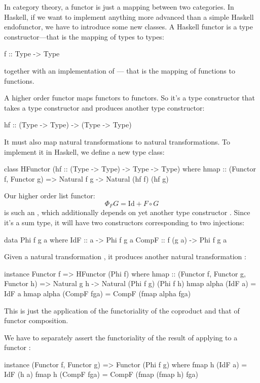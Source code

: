 \documentclass[DaoFP]{subfiles}
\begin{document}
In category theory, a functor is just a mapping between two categories. In Haskell, if we want to implement anything more advanced than a simple Haskell endofunctor, we have to introduce some new classes. A Haskell functor is a type constructor---that is the mapping of types to types:
\begin{haskell}
f :: Type -> Type
\end{haskell}
together with an implementation of --- that is the mapping of functions to functions. 

A higher order functor maps functors to functors. So it's a type constructor that takes a type constructor and produces another type constructor:
\begin{haskell}
hf :: (Type -> Type) -> (Type -> Type)
\end{haskell}
It must also map natural transformations to natural transformations. To implement it in Haskell, we define a new type class:
\begin{haskell}
class HFunctor (hf :: (Type -> Type) -> Type -> Type) where
   hmap :: (Functor f, Functor g) => 
       Natural f g -> Natural (hf f) (hf g)
\end{haskell}

Our higher order list functor:
\[ \Phi_F G = \text{Id} + F \circ G \]
is such an , which additionally depends on yet another type constructor . Since it's a sum type, it will have two constructors corresponding to two injections:
\begin{haskell}
data Phi f g a where
   IdF :: a -> Phi f g a
   CompF :: f (g a) -> Phi f g a
\end{haskell}
Given a natural transformation , it produces another natural transformation :
\begin{haskell}
instance Functor f => HFunctor (Phi f) where
   hmap :: (Functor f, Functor g, Functor h) =>
          Natural g h -> Natural (Phi f g) (Phi f h)
   hmap alpha (IdF a) = IdF a
   hmap alpha (CompF fga) = CompF (fmap alpha fga)
\end{haskell}
This is just the application of the functoriality of the coproduct and that of functor composition.

We have to separately assert the functoriality of the result of applying  to a functor :
\begin{haskell}
instance (Functor f, Functor g) => Functor (Phi f g) where
   fmap h (IdF a) = IdF (h a)
   fmap h (CompF fga) = CompF (fmap (fmap h) fga)
\end{haskell}
\end{document}
